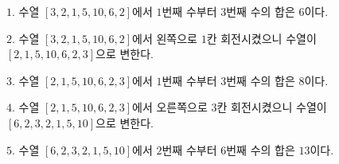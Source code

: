 $1$. 수열 $[3,2,1,5,10,6,2]$에서 $1$번째 수부터 $3$번째 수의 합은 $6$이다.

$2$. 수열 $[3,2,1,5,10,6,2]$에서 왼쪽으로 $1$칸 회전시켰으니 수열이 $[2,1,5,10,6,2,3]$으로 변한다.

$3$. 수열 $[2,1,5,10,6,2,3]$에서 $1$번째 수부터 $3$번째 수의 합은 $8$이다.

$4$. 수열 $[2,1,5,10,6,2,3]$에서 오른쪽으로 $3$칸 회전시켰으니 수열이 $[6,2,3,2,1,5,10]$으로 변한다.

$5$. 수열 $[6,2,3,2,1,5,10]$에서 $2$번째 수부터 $6$번째 수의 합은 $13$이다.
